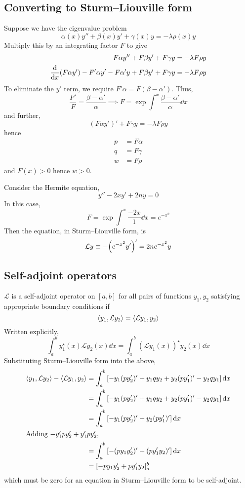 \subsection{Converting to Sturm--Liouville form}
Suppose we have the eigenvalue problem
\[
	\alpha(x) y'' + \beta(x) y' + \gamma(x) y = -\lambda \rho(x) y
\]
Multiply this by an integrating factor \( F \) to give
\begin{align*}
	F \alpha y'' + F \beta y' + F \gamma y                                          & = -\lambda F \rho y \\
	\dv{x} \qty(F \alpha y') - F' \alpha y' - F \alpha' y + F \beta y' + F \gamma y & = -\lambda F \rho y
\end{align*}
To eliminate the \( y' \) term, we require \( F'\alpha = F(\beta - \alpha') \).
Thus,
\[
	\frac{F'}{F} = \frac{\beta - \alpha'}{\alpha} \implies F = \exp \int^x \frac{\beta - \alpha'}{\alpha} \dd{x}
\]
and further,
\[
	(F\alpha y')' + F \gamma y = - \lambda F \rho y
\]
hence
\begin{align*}
	p & = F \alpha \\
	q & = F \gamma \\
	w & = F \rho
\end{align*}
and \( F(x) > 0 \) hence \( w > 0 \).
\begin{example}
	Consider the Hermite equation,
	\[
		y'' - 2xy' + 2ny = 0
	\]
	In this case,
	\[
		F = \exp \int^x \frac{-2x}{1} \dd{x} = e^{-x^2}
	\]
	Then the equation, in Sturm--Liouville form, is
	\[
		\mathcal L y \equiv -\qty(e^{-x^2} y')' = 2n e^{-x^2} y
	\]
\end{example}

\subsection{Self-adjoint operators}
\( \mathcal L \) is a self-adjoint operator on \( [a,b] \) for all pairs of functions \( y_1,y_2 \) satisfying appropriate boundary conditions if
\[
	\left\langle{y_1, \mathcal L y_2}\right\rangle = \left\langle{\mathcal L y_1, y_2}\right\rangle
\]
Written explicitly,
\[
	\int_a^b y_1^\star(x) \mathcal L y_2(x) \dd{x} = \int_a^b (\mathcal L y_1(x))^\star y_2(x) \dd{x}
\]
Substituting Sturm--Liouville form into the above,
\begin{align*}
	\left\langle{y_1, \mathcal L y_2}\right\rangle - \left\langle{\mathcal L y_1, y_2}\right\rangle & = \int_a^b \qty[-y_1 (py_2')' + y_1 q y_2 + y_2 (p y_1')' - y_2 q y_1] \dd{x} \\
	                                                          & = \int_a^b \qty[-y_1 (py_2')' + y_1 q y_2 + y_2 (p y_1')' - y_2 q y_1] \dd{x} \\
	                                                          & = \int_a^b \qty[-y_1 (py_2')' + y_2 (p y_1')'] \dd{x}                         \\
	\intertext{Adding \( -y_1' p y_2' + y_1' p y_2' \),}
	                                                          & = \int_a^b \qty[-(py_1y_2')' + (py_1'y_2)'] \dd{x}                            \\
	                                                          & = [-py_1y_2' + py_1'y_2]_a^b
\end{align*}
which must be zero for an equation in Sturm--Liouville form to be self-adjoint.

